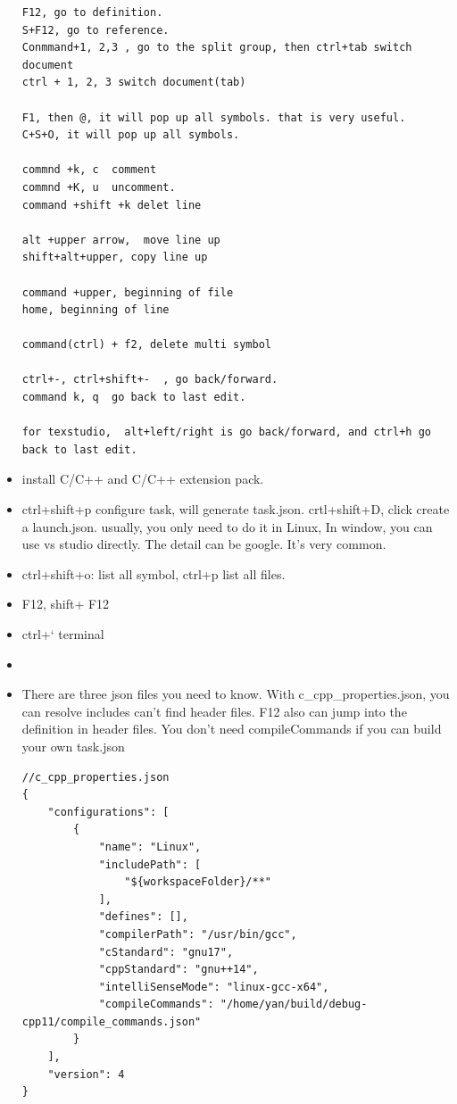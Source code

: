 \documentclass[a4paper,11pt,twoside]{book}
\begin{document}
\begin{itemize}
\begin{lstlisting}[]
F12, go to definition. 
S+F12, go to reference. 
Conmmand+1, 2,3 , go to the split group, then ctrl+tab switch document
ctrl + 1, 2, 3 switch document(tab)

F1, then @, it will pop up all symbols. that is very useful.
C+S+O, it will pop up all symbols. 

commnd +k, c  comment
commnd +K, u  uncomment.
command +shift +k delet line

alt +upper arrow,  move line up
shift+alt+upper, copy line up

command +upper, beginning of file
home, beginning of line

command(ctrl) + f2, delete multi symbol

ctrl+-, ctrl+shift+-  , go back/forward. 
command k, q  go back to last edit.

for texstudio,  alt+left/right is go back/forward, and ctrl+h go back to last edit.
\end{lstlisting}

	\item install C/C++ and C/C++ extension pack.
\item ctrl+shift+p configure task, will generate task.json. crtl+shift+D, click create a launch.json. 
usually, you only need to do it in Linux, In window, you can use vs studio directly. The detail can be google. It's very common.

\item ctrl+shift+o: list all symbol, ctrl+p list all files.
\item F12, shift+ F12
\item ctrl+`  terminal 
\item 

\item There are three json files you need to know. With c\_cpp\_properties.json, you can resolve includes can't find header files. F12 also can jump into the definition in header files. You don't need compileCommands if you can build your own task.json
    
\begin{lstlisting}[mathescape=false]
//c_cpp_properties.json
{
    "configurations": [
        {
            "name": "Linux",
            "includePath": [
                "${workspaceFolder}/**"
            ],
            "defines": [],
            "compilerPath": "/usr/bin/gcc",
            "cStandard": "gnu17",
            "cppStandard": "gnu++14",
            "intelliSenseMode": "linux-gcc-x64",
            "compileCommands": "/home/yan/build/debug-cpp11/compile_commands.json"
        }
    ],
    "version": 4
}
\end{lstlisting}


\end{itemize}
\end{document}
